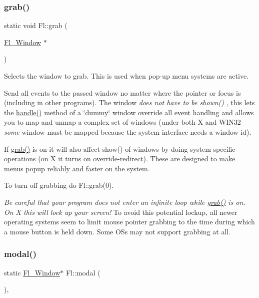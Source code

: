 \subsubsection{\texorpdfstring{grab()}{grab()}\hspace{0.1cm}{\footnotesize\ttfamily [2/2]}}
{\footnotesize\ttfamily static void Fl\+::grab (\begin{DoxyParamCaption}\item[{\hyperlink{class_fl___window}{Fl\+\_\+\+Window} $\ast$}]{ }\end{DoxyParamCaption})\hspace{0.3cm}{\ttfamily [static]}}

Selects the window to grab. This is used when pop-\/up menu systems are active.

Send all events to the passed window no matter where the pointer or focus is (including in other programs). The window {\itshape does not have to be shown()} , this lets the \hyperlink{group__fl__events_ga62aea907b7eb34f14adbb8c92b2df221}{handle()} method of a \char`\"{}dummy\char`\"{} window override all event handling and allows you to map and unmap a complex set of windows (under both X and W\+I\+N32 {\itshape some} window must be mapped because the system interface needs a window id).

If \hyperlink{group__fl__windows_ga100705a8107397cfde7318aa34019739}{grab()} is on it will also affect show() of windows by doing system-\/specific operations (on X it turns on override-\/redirect). These are designed to make menus popup reliably and faster on the system.

To turn off grabbing do Fl\+::grab(0).

{\itshape Be careful that your program does not enter an infinite loop while \hyperlink{group__fl__windows_ga100705a8107397cfde7318aa34019739}{grab()} is on. On X this will lock up your screen!} To avoid this potential lockup, all newer operating systems seem to limit mouse pointer grabbing to the time during which a mouse button is held down. Some OS\textquotesingle{}s may not support grabbing at all. \mbox{\label{group__fl__windows_gaf0938156f04e1babebaa8eb75a8d0fce}} 
\subsubsection{\texorpdfstring{modal()}{modal()}}
{\footnotesize\ttfamily static \hyperlink{class_fl___window}{Fl\+\_\+\+Window}$\ast$ Fl\+::modal (\begin{DoxyParamCaption}{ }\end{DoxyParamCaption})\hspace{0.3cm}{\ttfamily [inline]}, {\ttfamily [static]}}

